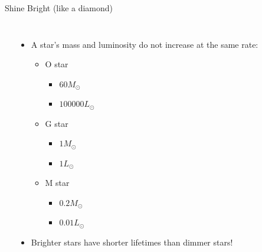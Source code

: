 \documentclass[pdf,aspectratio=169]{beamer}
\begin{document}
\begin{frame}{Shine Bright \scriptsize(like a diamond)}
  \begin{columns}
	\begin{center}
	\end{center}
	\begin{itemize}
	  \item A star's mass and luminosity do not increase at the same rate:
		\begin{itemize}
		  \item O star
			\begin{itemize}
			  \item $60 M_\odot$
			  \item $100000 L_\odot$
			\end{itemize}
		  \item G star
			\begin{itemize}
			  \item $1 M_\odot$
			  \item $1 L_\odot$
			\end{itemize}
		  \item M star
			\begin{itemize}
			  \item $0.2 M_\odot$
			  \item $0.01 L_\odot$
			\end{itemize}
		\end{itemize}
	  \item Brighter stars have shorter lifetimes than dimmer stars!
	\end{itemize}
  \end{columns}
\end{frame}
\end{document}
